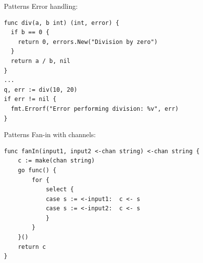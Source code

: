 \documentclass[pdf,xcolor=dvipsnames,noparindent]{beamer}
\begin{document}
\begin{frame}[fragile]{Patterns}
  Error handling:
  \pause
\begin{verbatim}
func div(a, b int) (int, error) {
  if b == 0 {
    return 0, errors.New("Division by zero")
  }
  return a / b, nil
}
...
q, err := div(10, 20)
if err != nil {
  fmt.Errorf("Error performing division: %v", err)
}
\end{verbatim}
\end{frame}

\begin{frame}[fragile]{Patterns}
  Fan-in with channels:
  \pause
\begin{verbatim}
func fanIn(input1, input2 <-chan string) <-chan string {
    c := make(chan string)
    go func() {
        for {
            select {
            case s := <-input1:  c <- s
            case s := <-input2:  c <- s
            }
        }
    }()
    return c
}
\end{verbatim}
\end{frame}
\end{document}

